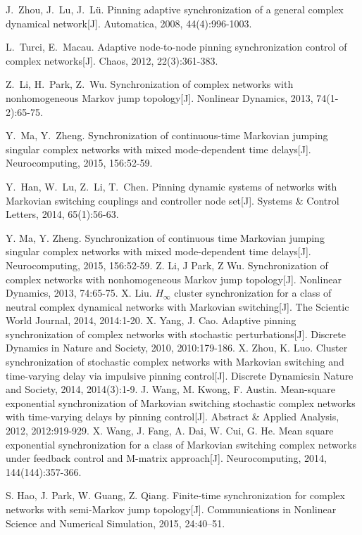 \begin{thebibliography}{99}
J.~Zhou, J.~Lu, J.~L{\"{u}}.
 Pinning adaptive synchronization of a general complex dynamical network[J].
Automatica, 2008, 44(4):996-1003.

L.~Turci, E.~Macau.
 Adaptive node-to-node pinning synchronization control of complex networks[J].
Chaos, 2012, 22(3):361-383.

Z.~Li, H.~Park, Z.~Wu.
 Synchronization of complex networks with nonhomogeneous {M}arkov jump topology[J].
Nonlinear Dynamics, 2013, 74(1-2):65-75.

Y.~Ma, Y.~Zheng.
 Synchronization of continuous-time {M}arkovian jumping singular complex networks with mixed mode-dependent time delays[J].
Neurocomputing, 2015, 156:52-59.

Y.~Han, W.~Lu, Z.~Li, T.~Chen.
 Pinning dynamic systems of networks with {M}arkovian switching couplings and controller node set[J].
Systems \& Control Letters, 2014, 65(1):56-63.

 Y. Ma, Y. Zheng. Synchronization of continuous time Markovian jumping singular complex networks with mixed mode-dependent time delays[J].
 Neurocomputing, 2015, 156:52-59.
 Z. Li, J Park, Z Wu. Synchronization of complex networks with nonhomogeneous Markov jump topology[J]. Nonlinear Dynamics, 2013, 74:65-75.
 X. Liu. {$H_\infty$} cluster synchronization for a class of neutral complex dynamical networks with Markovian switching[J]. The Scientic World Journal, 2014, 2014:1-20.
 X. Yang, J. Cao. Adaptive pinning synchronization of complex networks with stochastic perturbations[J]. Discrete Dynamics in Nature and Society, 2010, 2010:179-186.
 X. Zhou, K. Luo. Cluster synchronization of stochastic complex networks with Markovian switching and time-varying delay via impulsive pinning control[J]. Discrete Dynamicsin Nature and Society, 2014, 2014(3):1-9.
 J. Wang, M. Kwong, F. Austin. Mean-square exponential synchronization of Markovian switching stochastic complex networks with time-varying delays by pinning control[J]. Abstract \& Applied Analysis, 2012, 2012:919-929.
 X. Wang, J. Fang, A. Dai, W. Cui, G. He. Mean square exponential synchronization for a class of Markovian switching complex networks under feedback control and M-matrix approach[J]. Neurocomputing, 2014, 144(144):357-366.

 S. Hao, J. Park, W. Guang, Z. Qiang. Finite-time synchronization for complex networks with semi-Markov jump topology[J]. Communications in Nonlinear Science and Numerical Simulation, 2015, 24:40–51.


\end{thebibliography}
